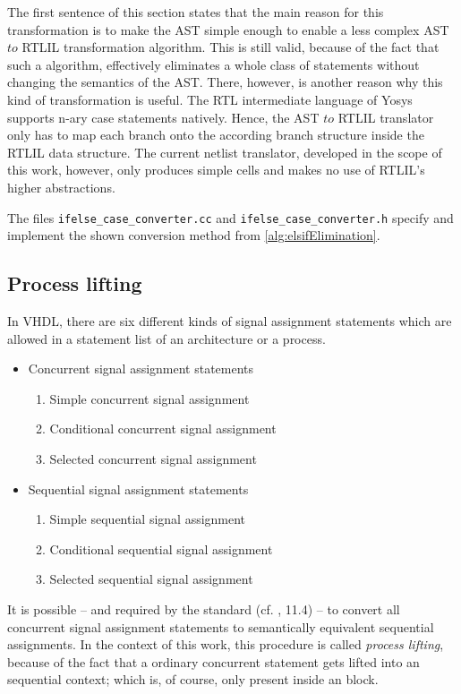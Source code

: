 %
The first sentence of this section states that the main reason for
this transformation is to make the AST simple enough to enable a less
complex AST \(to\) RTLIL transformation algorithm. This is still
valid, because of the fact that such a algorithm, effectively eliminates
a whole class of statements without changing the semantics of the AST.
There, however, is another reason why this kind of transformation is
useful. The RTL intermediate language of Yosys supports n-ary case
statements natively. Hence, the AST \(to\) RTLIL translator only has
to map each  branch onto the according branch structure
inside the RTLIL data structure. The current netlist translator,
developed in the scope of this work, however, only produces simple
cells and makes no use of RTLIL's higher abstractions.

The files \texttt{ifelse_case_converter.cc} and
\texttt{ifelse_case_converter.h} specify and implement the shown
conversion method from \ref{alg:elsifElimination}.

\subsection{Process lifting}
\label{sec:Process lifting}

In VHDL, there are six different kinds of signal assignment statements
which are allowed in a statement list of an architecture or a
process.
%
\begin{itemize}
    \item Concurrent signal assignment statements
    \begin{enumerate}
        \item Simple concurrent signal assignment
        \item Conditional concurrent signal assignment
        \item Selected concurrent signal assignment
    \end{enumerate}

    \item Sequential signal assignment statements
    \begin{enumerate}
        \item Simple sequential signal assignment
        \item Conditional sequential signal assignment
        \item Selected sequential signal assignment
    \end{enumerate}
\end{itemize}
%
It is possible -- and required by the standard (cf. \cite{IEEELRM},
11.4) --
to convert all concurrent signal assignment statements to semantically
equivalent sequential assignments. In the context of this work, this
procedure is called \emph{process lifting}, because of the fact that a
ordinary concurrent statement gets lifted into an sequential
context; which is, of course, only present inside an  block.


